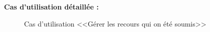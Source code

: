 \documentclass[12pt]{report}
\begin{document}
\vspace{0.2in}

\textbf{Cas d'utilisation détaillée :}

\vspace{0.2in}

\begin{figure}[h]
\centering
    \centerline{}
    \caption{Cas d'utilisation <<Gérer les recours qui on été soumis>>}
\end{figure}
\end{document}

